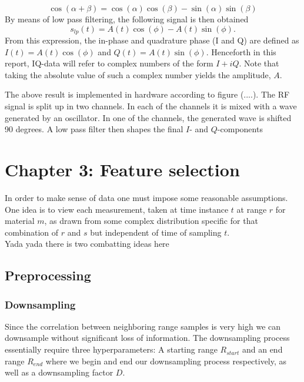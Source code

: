\documentclass[a4paper, 12pt]{article}
\begin{document}
\begin{equation}
	\label{eq:IQtrig}
	\cos(\alpha+\beta) = \cos(\alpha)\cos(\beta)-\sin(\alpha)\sin(\beta)
\end{equation}
By means of low pass filtering, the following signal is then obtained
\begin{equation}
	s_{lp}(t)=A(t)\cos(\phi)-A(t)\sin(\phi).
\end{equation}
From this expression, the in-phase and quadrature phase (I and Q) are defined as $I(t)=A(t)\cos(\phi)$ and $Q(t)=A(t)\sin(\phi)$. Henceforth in this report, IQ-data will refer to complex numbers of the form $I+i Q$. Note that taking the absolute value of such a complex number yields the amplitude, $A$.

The above result is implemented in hardware according to figure (....). The RF signal is split up in two channels. In each of the channels it is mixed with a wave generated by an oscillator. In one of the channels, the generated wave is shifted 90 degrees. A low pass filter then shapes the final $I$- and $Q$-components



\section{Chapter 3: Feature selection}

In order to make sense of data one must impose some reasonable assumptions. 
\\ 
One idea is to view each measurement, taken at time instance $t$ at range $r$ for material $m$, as drawn from some 
complex distribution specific for that combination of $r$ and $s$ but independent of time of sampling $t$. 
\\
Yada yada there is two combatting ideas here

\subsection{Preprocessing}

\subsubsection{Downsampling}

Since the correlation between neighboring range samples is very high we can downsample without significant loss of information. The downsampling process essentially require three hyperparameters: A starting range $R_{start}$ and an end range $R_{end}$ where we begin and end our downsampling process respectively, as well as a downsampling factor $D$.
\end{document}
